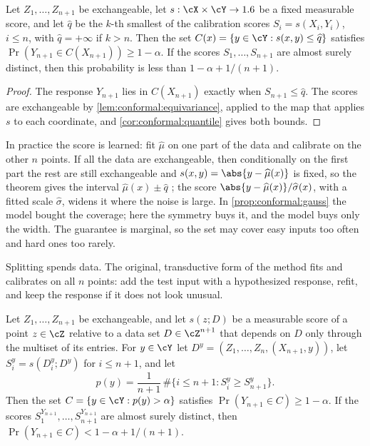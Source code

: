 \begin{refsection}
\begin{theorem}\label{thm:conformal:split}
Let $Z_1,\dots,Z_{n+1}$ be exchangeable, let $s:\cX\times\cY\to\R$ be a fixed measurable score, and let $\widehat q$ be the $k$-th smallest of the calibration scores $S_i=s(X_i,Y_i)$, $i\le n$, with $\widehat q=+\infty$ if $k>n$. Then the set $C(x)=\{y\in\cY : s(x,y)\le\widehat q\}$ satisfies $\Pr(Y_{n+1}\in C(X_{n+1}))\ge1-\alpha$. If the scores $S_1,\dots,S_{n+1}$ are almost surely distinct, then this probability is less than $1-\alpha+1/(n+1)$.
\end{theorem}

\begin{proof}
The response $Y_{n+1}$ lies in $C(X_{n+1})$ exactly when $S_{n+1}\le\widehat q$. The scores are exchangeable by \cref{lem:conformal:equivariance}, applied to the map that applies $s$ to each coordinate, and \cref{cor:conformal:quantile} gives both bounds.
\end{proof}

In practice the score is learned: fit $\widehat\mu$ on one part of the data and calibrate on the other $n$ points. If all the data are exchangeable, then conditionally on the first part the rest are still exchangeable and $s(x,y)=\abs{y-\widehat\mu(x)}$ is fixed, so the theorem gives the interval $\widehat\mu(x)\pm\widehat q$ \parencite{Papadopoulos2002,Lei2018}; the score $\abs{y-\widehat\mu(x)}/\widehat\sigma(x)$, with a fitted scale $\widehat\sigma$, widens it where the noise is large. In \cref{prop:conformal:gauss} the model bought the coverage; here the symmetry buys it, and the model buys only the width. The guarantee is marginal, so the set may cover easy inputs too often and hard ones too rarely.

Splitting spends data. The original, transductive form of the method \parencite{Gammerman1998,Vovk2005} fits and calibrates on all $n$ points: add the test input with a hypothesized response, refit, and keep the response if it does not look unusual.

\begin{theorem}\label{thm:conformal:full}
Let $Z_1,\dots,Z_{n+1}$ be exchangeable, and let $s(z;D)$ be a measurable score of a point $z\in\cZ$ relative to a data set $D\in\cZ^{n+1}$ that depends on $D$ only through the multiset of its entries. For $y\in\cY$ let $D^y=(Z_1,\dots,Z_n,(X_{n+1},y))$, let $S^y_i=s(D^y_i;D^y)$ for $i\le n+1$, and let
\[
p(y)=\frac{1}{n+1}\,\#\bigl\{i\le n+1 : S^y_i\ge S^y_{n+1}\bigr\}.
\]
Then the set $C=\{y\in\cY : p(y)>\alpha\}$ satisfies $\Pr(Y_{n+1}\in C)\ge1-\alpha$. If the scores $S^{Y_{n+1}}_1,\dots,S^{Y_{n+1}}_{n+1}$ are almost surely distinct, then $\Pr(Y_{n+1}\in C)<1-\alpha+1/(n+1)$.
\end{theorem}


\end{refsection}
